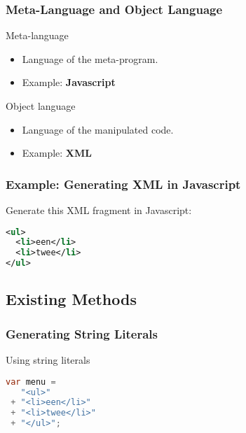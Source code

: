\documentclass{beamer}
\begin{document}


\begin{frame}

  \frametitle{Meta-Language and Object Language}

  \begin{block}{Meta-language}
    \begin{itemize}
      \item Language of the meta-program.
      \item Example: {\bf Javascript}
    \end{itemize}
  \end{block}

  \begin{block}{Object language}
    \begin{itemize}
      \item Language of the manipulated code.
      \item Example: {\bf XML}
    \end{itemize}
  \end{block}

\end{frame}


\begin{frame}[fragile]

  \frametitle{Example: Generating XML in Javascript}

  Generate this XML fragment in Javascript:

  \begin{lstlisting}[language=XML]
<ul>
  <li>een</li>
  <li>twee</li>
</ul>
  \end{lstlisting}

\end{frame}


\subsection{Existing Methods}

\begin{frame}[fragile]

  \frametitle{Generating String Literals}

  \begin{block}{Using string literals}
    \begin{lstlisting}[language=Java]
var menu =
   "<ul>"
 + "<li>een</li>"
 + "<li>twee</li>"
 + "</ul>";
    \end{lstlisting}
  \end{block}

\end{frame}
\end{document}
